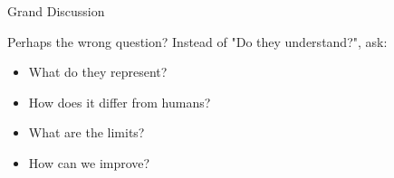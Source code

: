 \documentclass[aspectratio=169]{beamer}
\begin{document}
\begin{frame}[shrink=10]{Grand Discussion 💬}
\vspace{1em}

\begin{alertblock}{Perhaps the wrong question?}
Instead of "Do they understand?", ask:
\begin{itemize}\setlength{\itemsep}{0pt}
    \item What do they represent?
    \item How does it differ from humans?
    \item What are the limits?
    \item How can we improve?
\end{itemize}
\end{alertblock}
\end{frame}

\end{document}
